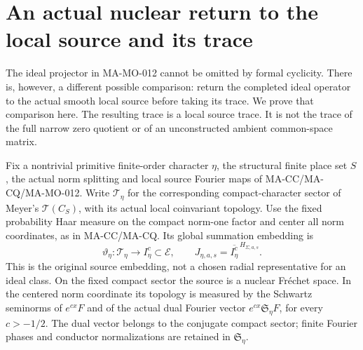 \section{An actual nuclear return to the local source and its trace}
\label{sec:local-source-return}

The ideal projector in MA-MO-012 cannot be omitted by formal
cyclicity. There is, however, a different possible comparison:
return the completed ideal operator to the actual smooth local
source before taking its trace. We prove that comparison here.
The resulting trace is a local source trace. It is not the trace
of the full narrow zero quotient or of an unconstructed ambient
common-space matrix.

Fix a nontrivial primitive finite-order character \(\eta\), the
structural finite place set \(S\), the actual norm splitting and
local source Fourier maps of MA-CC/MA-CQ/MA-MO-012. Write
\(\mathcal T_\eta\) for the corresponding compact-character
sector of Meyer's \(\mathcal T(C_S)\), with its actual local
coinvariant topology. Use the fixed probability Haar measure
on the compact norm-one factor and center all norm coordinates,
as in MA-CC/MA-CQ. Its global
summation embedding is
\[
 \vartheta_\eta:\mathcal T_\eta\longrightarrow
 I_\eta^c\subset\mathcal E,\qquad
 J_{\eta,a,s}=\overline{I_\eta^c}^{\,H_{\Sigma,a,s}}.
 \tag{MA-MO.280}
\]
This is the original source embedding, not a chosen radial
representative for an ideal class. On the fixed compact sector
the source is a nuclear Fr\'echet space. In the centered norm
coordinate its topology is measured by the Schwartz seminorms
of \(e^{cx}F\) and of the actual dual Fourier vector
\(e^{cx}\mathfrak S_\eta F\), for every \(c>-1/2\).
The dual vector belongs to the conjugate compact sector; finite
Fourier phases and conductor normalizations are retained in
\(\mathfrak S_\eta\).

